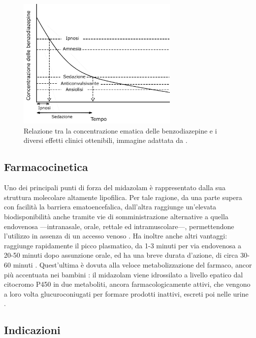 \begin{figure}[!h]
    \centering
    \includegraphics[width=0.7\textwidth]{Figure/figurabenzo.pdf}
    \caption{Relazione tra la concentrazione ematica delle benzodiazepine e i diversi effetti clinici ottenibili, immagine adattata da \cite{Olkkola2008}.}
    \label{fig:benzo}
\end{figure}

\subsection*{Farmacocinetica}

Uno dei principali punti di forza del midazolam è rappresentato dalla sua struttura molecolare altamente lipofilica. Per tale ragione, da una parte supera con facilità la barriera ematoencefalica, dall'altra raggiunge un'elevata biodisponibilità anche tramite vie di somministrazione alternative a quella endovenosa ---intranasale, orale, rettale ed intramuscolare---, permettendone l'utilizzo in assenza di un accesso venoso \cite{Krauss2006}. Ha inoltre anche altri vantaggi: raggiunge rapidamente il picco plasmatico, da 1-3 minuti per via endovenosa a 20-50 minuti dopo assunzione orale, ed ha una breve durata d'azione, di circa 30-60 minuti \cite{Simeupsedazione, Uptodatepharmacology}. 
Quest'ultima è dovuta alla veloce metabolizzazione del farmaco, ancor più accentuata nei bambini \cite{Payne1989}: il midazolam viene idrossilato a livello epatico dal citocromo P450 in due metaboliti, ancora farmacologicamente attivi, che vengono a loro volta glucuroconiugati per formare prodotti inattivi, escreti poi nelle urine \cite{Olkkola2008}. 

\subsection*{Indicazioni}


